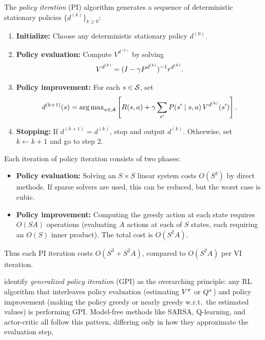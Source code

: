 \documentclass[11pt,a4paper]{article}
\begin{document}
\begin{definition}
\label{def:pi}
The \emph{policy iteration} (PI) algorithm generates a sequence of
deterministic stationary policies $\{d^{(k)}\}_{k \geq 0}$:
\begin{enumerate}[nosep]
    \item \textbf{Initialize:} Choose any deterministic stationary
    policy $d^{(0)}$.
    \item \textbf{Policy evaluation:} Compute $V^{d^{(k)}}$ by
    solving
    \begin{equation}
    \label{eq:pi-eval}
        V^{d^{(k)}} = (I - \gamma P^{d^{(k)}})^{-1}
        r^{d^{(k)}}.
    \end{equation}
    \item \textbf{Policy improvement:} For each $s \in \mathcal{S}$,
    set
    \begin{equation}
    \label{eq:pi-improve}
        d^{(k+1)}(s) = \operatorname{arg\,max}_{a \in \mathcal{A}}
        \left[ R(s,a) + \gamma \sum_{s'} P(s' \mid s,a)\,
        V^{d^{(k)}}(s') \right].
    \end{equation}
    \item \textbf{Stopping:} If $d^{(k+1)} = d^{(k)}$, stop and
    output $d^{(k)}$. Otherwise, set $k \leftarrow k+1$ and go to
    step 2.
\end{enumerate}
\end{definition}

\begin{remark}
\label{rem:pi-complexity}
Each iteration of policy iteration consists of two phases:
\begin{itemize}[nosep]
    \item \textbf{Policy evaluation:} Solving an $S \times S$ linear
    system costs $O(S^3)$ by direct methods. If sparse solvers are
    used, this can be reduced, but the worst case is cubic.
    \item \textbf{Policy improvement:} Computing the greedy action at
    each state requires $O(SA)$ operations (evaluating $A$ actions at
    each of $S$ states, each requiring an $O(S)$ inner product).
    The total cost is $O(S^2 A)$.
\end{itemize}
Thus each PI iteration costs $O(S^3 + S^2 A)$, compared to
$O(S^2 A)$ per VI iteration.
\end{remark}

\begin{rlconnection}[title={Generalized Policy Iteration}]
\citet{suttonbarto2018} identify \emph{generalized policy iteration}
(GPI) as the overarching principle: any RL algorithm that interleaves
policy evaluation (estimating $V^\pi$ or $Q^\pi$) and policy
improvement (making the policy greedy or nearly greedy w.r.t.\ the
estimated values) is performing GPI. Model-free methods like SARSA,
Q-learning, and actor-critic all follow this pattern, differing only
in how they approximate the evaluation step.
\end{rlconnection}
\end{document}
